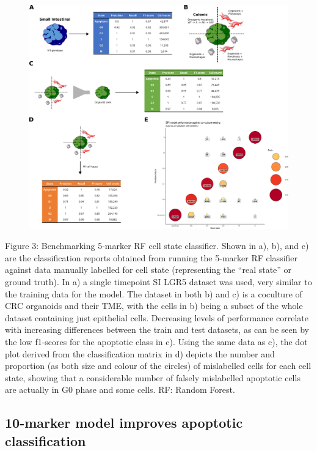 \begin{figure}
    \centering
    \includegraphics{03cytof/figs/3CLASS_5m.png}
    \caption{}
    \label{fig:3class5m}
\end{figure}
 
Figure 3: Benchmarking 5-marker RF cell state classifier. Shown in a), b), and c) are the classification reports obtained from running the 5-marker RF classifier against data manually labelled for cell state (representing the “real state” or ground truth). In a) a single timepoint SI LGR5 dataset was used, very similar to the training data for the model. The dataset in both b) and c) is a coculture of CRC organoids and their TME, with the cells in b) being a subset of the whole dataset containing just epithelial cells. Decreasing levels of performance correlate with increasing differences between the train and test datasets, as can be seen by the low f1-scores for the apoptotic class in c). Using the same data as c), the dot plot derived from the classification matrix in d) depicts the number and proportion (as both size and colour of the circles) of mislabelled cells for each cell state, showing that a considerable number of falsely mislabelled apoptotic cells are actually in G0 phase and some cells. RF: Random Forest.



\subsection{10-marker model improves apoptotic classification}

